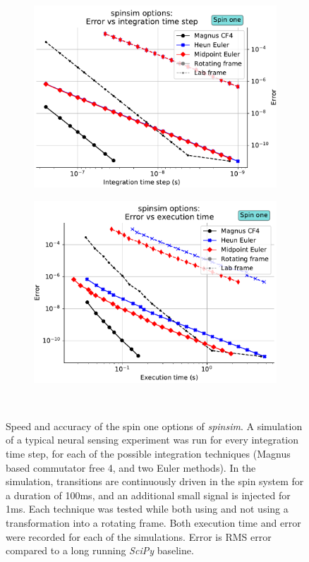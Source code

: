\documentclass{jors}
\begin{document}
		\begin{figure}[h!]
			\begin{subfigure}[b]{0.475\textwidth}
				\includegraphics[scale=0.475]{benchmark_spin_one_step_error.pdf}
				\caption{}
				\label{fig:benchmark_spin_one_step_error}
			\end{subfigure}
			\hfill
			\begin{subfigure}[b]{0.475\textwidth}
				\includegraphics[scale=0.475]{benchmark_spin_one_execution_error.pdf}
				\caption{}
				\label{fig:benchmark_spin_one_execution_error}
			\end{subfigure}\
			\caption{Speed and accuracy of the spin one options of \emph{spinsim}.
			A simulation of a typical neural sensing experiment was run for every integration time step, for each of the possible integration techniques (Magnus based commutator free 4, and two Euler methods).
			In the simulation, transitions are continuously driven in the spin system for a duration of 100ms, and an additional small signal is injected for 1ms.
			Each technique was tested while both using and not using a transformation into a rotating frame.
			Both execution time and error were recorded for each of the simulations.
			Error is RMS error compared to a long running \emph{SciPy} baseline.}
			\label{fig:benchmark_spin_one}
		\end{figure}
\end{document}
